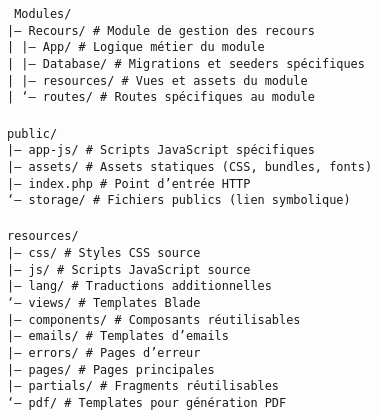 \begin{tcolorbox}[colback=black!5!white, colframe=black!75!white, title=Suite de la structure du projet OptiHR, fonttitle=\bfseries]
    \texttt{
        Modules/ \\
        |-- Recours/          \quad \# Module de gestion des recours \\
        |   |-- App/          \quad \# Logique métier du module \\
        |   |-- Database/     \quad \# Migrations et seeders spécifiques \\
        |   |-- resources/    \quad \# Vues et assets du module \\
        |   `-- routes/       \quad \# Routes spécifiques au module \\
        \\
        public/ \\
        |-- app-js/           \quad \# Scripts JavaScript spécifiques \\
        |-- assets/           \quad \# Assets statiques (CSS, bundles, fonts) \\
        |-- index.php         \quad \# Point d'entrée HTTP \\
        `-- storage/          \quad \# Fichiers publics (lien symbolique) \\
        \\
        resources/ \\
        |-- css/              \quad \# Styles CSS source \\
        |-- js/               \quad \# Scripts JavaScript source \\
        |-- lang/             \quad \# Traductions additionnelles \\
        `-- views/            \quad \# Templates Blade \\
        |-- components/   \quad \# Composants réutilisables \\
        |-- emails/       \quad \# Templates d'emails \\
        |-- errors/       \quad \# Pages d'erreur \\
        |-- pages/        \quad \# Pages principales \\
        |-- partials/     \quad \# Fragments réutilisables \\
        `-- pdf/          \quad \# Templates pour génération PDF \\
    }
\end{tcolorbox}

\vspace{0.5cm}

